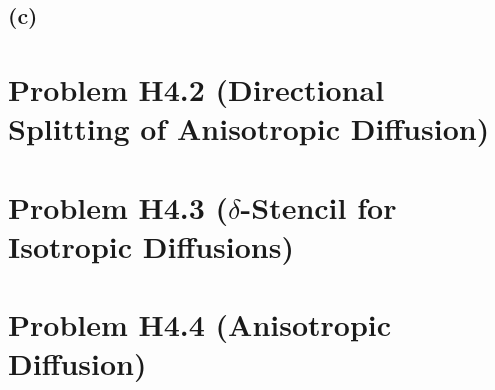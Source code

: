 \documentclass[11pt]{article}
\begin{document}
\subsection*{(c)}

\section*{Problem H4.2 (Directional Splitting of Anisotropic Diffusion)}

\section*{Problem H4.3 ($\delta$-Stencil for Isotropic Diffusions)}
\section*{Problem H4.4 (Anisotropic Diffusion)}
\end{document}
